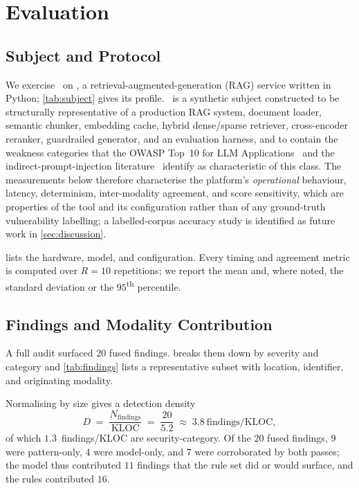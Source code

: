 \section{Evaluation}
\label{sec:results}

\subsection{Subject and Protocol}
We exercise \cs\ on \vellum, a retrieval-augmented-generation (RAG)
service written in Python; \cref{tab:subject} gives its profile. \vellum\
is a synthetic subject constructed to be structurally representative of a
production RAG system, document loader, semantic chunker, embedding
cache, hybrid dense/sparse retriever, cross-encoder reranker, guardrailed
generator, and an evaluation harness, and to contain the weakness
categories that the OWASP Top~10 for LLM
Applications~\cite{owaspllm2025} and the indirect-prompt-injection
literature~\cite{greshake2023,perez2022ignore} identify as
characteristic of this class. The measurements below therefore
characterise the platform's \emph{operational} behaviour, latency,
determinism, inter-modality agreement, and score sensitivity, which are
properties of the tool and its configuration rather than of any
ground-truth vulnerability labelling; a labelled-corpus accuracy study is
identified as future work in \cref{sec:discussion}.

 lists the hardware, model, and configuration.
Every timing and agreement metric is computed over $R=10$ repetitions;
we report the mean and, where noted, the standard deviation or the
$95$\textsuperscript{th} percentile.



\subsection{Findings and Modality Contribution}
A full audit surfaced $20$ fused findings.  breaks
them down by severity and category and \cref{tab:findings} lists a
representative subset with location, identifier, and originating
modality.




Normalising by size gives a detection density
\begin{equation}
 D \;=\; \frac{N_{\text{findings}}}{\text{KLOC}}
 \;=\; \frac{20}{5.2} \;\approx\; 3.8~\text{findings/KLOC},
 \label{eq:density}
\end{equation}
of which $1.3$~findings/KLOC are security-category. Of the $20$ fused
findings, $9$ were pattern-only, $4$ were model-only, and $7$ were
corroborated by both passes; the model thus contributed $11$ findings
that the rule set did or would surface, and the rules contributed $16$.

